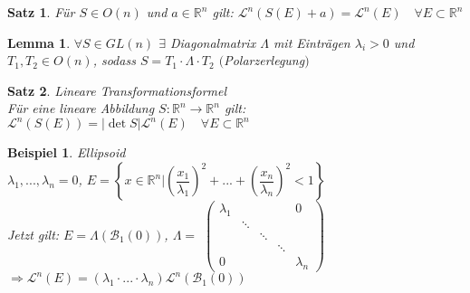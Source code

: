 \documentclass[11pt]{memoir}
\theoremstyle{changebreak}
\newtheorem{Beispiel}{Beispiel}[chapter]
\newtheorem{Lemma}{Lemma}[chapter]
\newtheorem{Satz}{Satz}[chapter]
\begin{document}
\begin{Satz}
Für $S \in O(n)$ und $a \in \mathbb R^n$ gilt:
$\mathscr L^n (S(E) +a) = \mathscr L^n(E)\quad \forall E \subset \mathbb R^n$
\end{Satz}


\begin{Lemma}
$\forall S \in GL(n)$ $\exists$ Diagonalmatrix $\Lambda$ mit Einträgen $\lambda_i > 0$ und $T_1, T_2 \in O(n)$, sodass $S = T_1\cdotp\Lambda\cdotp T_2$ $($Polarzerlegung$)$
\end{Lemma}


\begin{Satz}
\emph{Lineare Transformationsformel} \\
Für eine lineare Abbildung $S: \mathbb R^n \rightarrow \mathbb R^n$ gilt: $\mathscr L^n(S(E)) = |\det S| \mathscr L^n(E)\quad \forall E \subset \mathbb R^n$
\end{Satz}


\begin{Beispiel}
\emph{Ellipsoid} \\
$\lambda_1, ..., \lambda_n = 0$, $E = \left\{ x \in \mathbb R^n | \left( \dfrac{x_1}{\lambda_1} \right)^2 + ... + \left (\dfrac{x_n}{\lambda_n}\right)^2 < 1 \right\}$ \\
Jetzt gilt: $E = \Lambda(\mathscr B_1(0))$, $\Lambda =$
$\begin{pmatrix}
      \lambda_1 & 	 &	&	& 0 \\
      		 &  	\ddots \\
		 &	& \ddots \\
		 &	&	& \ddots \\
		 0 &	&	&	&	\lambda_n
\end{pmatrix}$
$\Rightarrow \mathscr L^n(E) = (\lambda_1 \cdotp ... \cdotp \lambda_n)\mathscr L^n(\mathscr B_1(0))$
\end{Beispiel}
\end{document}
